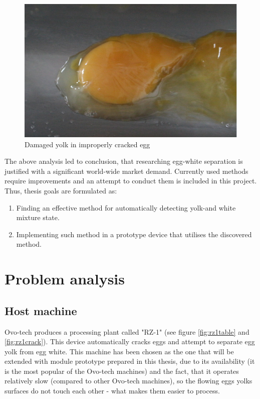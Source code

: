 \documentclass[12pt,twoside,a4paper]{article}
\begin{document}
 
\begin{figure}[H]
\centering
\includegraphics[width=0.4\paperwidth]{damg}
\caption{Damaged yolk in improperly cracked egg}\label{fig:damg}
\end{figure}


The above analysis led to conclusion, that researching egg-white separation is justified with a significant world-wide market demand. Currently used methods require improvements and an attempt to conduct them is included in this project. Thus, thesis goals are formulated as:
\begin{enumerate}
\item Finding an effective method for automatically detecting yolk-and white mixture state.
\item Implementing such method in a prototype device that utilises the discovered method.
\end{enumerate}

\newpage
\section{Problem analysis}
\subsection{Host machine}
Ovo-tech produces a processing plant called "RZ-1" (see figure \ref{fig:rz1table} and \ref{fig:rz1crack}).
This device automatically cracks  eggs and attempt to separate egg yolk from egg white. This machine has been chosen as the one that will be extended with module prototype prepared in this thesis, due to its availability (it is the most popular of the Ovo-tech machines) and the fact, that it operates relatively slow (compared to other Ovo-tech machines), so the flowing eggs yolks surfaces do not touch each other - what makes them easier to process.
\end{document}
